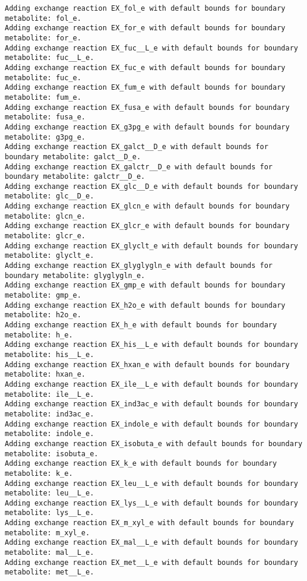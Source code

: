 \documentclass[
  letterpaper,
  DIV=11,
  numbers=noendperiod]{scrartcl}
\begin{document}
\begin{verbatim}
Adding exchange reaction EX_fol_e with default bounds for boundary metabolite: fol_e.
Adding exchange reaction EX_for_e with default bounds for boundary metabolite: for_e.
Adding exchange reaction EX_fuc__L_e with default bounds for boundary metabolite: fuc__L_e.
Adding exchange reaction EX_fuc_e with default bounds for boundary metabolite: fuc_e.
Adding exchange reaction EX_fum_e with default bounds for boundary metabolite: fum_e.
Adding exchange reaction EX_fusa_e with default bounds for boundary metabolite: fusa_e.
Adding exchange reaction EX_g3pg_e with default bounds for boundary metabolite: g3pg_e.
Adding exchange reaction EX_galct__D_e with default bounds for boundary metabolite: galct__D_e.
Adding exchange reaction EX_galctr__D_e with default bounds for boundary metabolite: galctr__D_e.
Adding exchange reaction EX_glc__D_e with default bounds for boundary metabolite: glc__D_e.
Adding exchange reaction EX_glcn_e with default bounds for boundary metabolite: glcn_e.
Adding exchange reaction EX_glcr_e with default bounds for boundary metabolite: glcr_e.
Adding exchange reaction EX_glyclt_e with default bounds for boundary metabolite: glyclt_e.
Adding exchange reaction EX_glyglygln_e with default bounds for boundary metabolite: glyglygln_e.
Adding exchange reaction EX_gmp_e with default bounds for boundary metabolite: gmp_e.
Adding exchange reaction EX_h2o_e with default bounds for boundary metabolite: h2o_e.
Adding exchange reaction EX_h_e with default bounds for boundary metabolite: h_e.
Adding exchange reaction EX_his__L_e with default bounds for boundary metabolite: his__L_e.
Adding exchange reaction EX_hxan_e with default bounds for boundary metabolite: hxan_e.
Adding exchange reaction EX_ile__L_e with default bounds for boundary metabolite: ile__L_e.
Adding exchange reaction EX_ind3ac_e with default bounds for boundary metabolite: ind3ac_e.
Adding exchange reaction EX_indole_e with default bounds for boundary metabolite: indole_e.
Adding exchange reaction EX_isobuta_e with default bounds for boundary metabolite: isobuta_e.
Adding exchange reaction EX_k_e with default bounds for boundary metabolite: k_e.
Adding exchange reaction EX_leu__L_e with default bounds for boundary metabolite: leu__L_e.
Adding exchange reaction EX_lys__L_e with default bounds for boundary metabolite: lys__L_e.
Adding exchange reaction EX_m_xyl_e with default bounds for boundary metabolite: m_xyl_e.
Adding exchange reaction EX_mal__L_e with default bounds for boundary metabolite: mal__L_e.
Adding exchange reaction EX_met__L_e with default bounds for boundary metabolite: met__L_e.

\end{verbatim}
\end{document}
